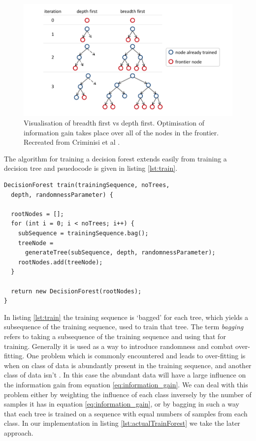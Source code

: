 \documentclass[12pt,twoside,notitlepage]{report}
\begin{document}
          \begin{figure}
              \centering
              \includegraphics[scale=0.3]{breadthfirst_vs_depthfirst}
              \caption[Visualisation of breadth first vs depth first.]{Visualisation of breadth first vs depth first. Optimisation of information gain takes place over 
              all of the nodes in the frontier. Recreated from Criminisi et al \cite{criminisi2013decision}.}
              \label{fig:breadth_first}
          \end{figure}

          The algorithm for training a decision forest extends easily from training a decision tree and psuedocode is 
          given in listing \ref{lst:train}.

          \begin{lstlisting}[float=tp,caption={Psuedocode to train a decision forest.},label={lst:train}]
DecisionForest train(trainingSequence, noTrees, 
  depth, randomnessParameter) {

  rootNodes = [];
  for (int i = 0; i < noTrees; i++) {
    subSequence = trainingSequence.bag();
    treeNode = 
      generateTree(subSequence, depth, randomnessParameter);
    rootNodes.add(treeNode);
  }

  return new DecisionForest(rootNodes);
}
          \end{lstlisting}

          In listing \ref{lst:train} the training sequence is `bagged' for each tree, which yields a subsequence of the 
          training sequence, used to train that tree. The term \textit{bagging} refers to taking a subsequence 
          of the training sequence and using that for training. Generally it is used as a way to introduce randomness and 
          combat over-fitting. One problem which is commonly encountered and leads to over-fitting is when 
          on class of data is abundantly present in the training sequence, and another class of data isn't \cite{criminisi2013decision}. 
          In this case the abundant data will have a large influence 
          on the information gain from equation \ref{eq:information_gain}. We 
          can deal with this problem either by weighting the influence of each class inversely by the number of samples it has in equation 
          \ref{eq:information_gain}, or by bagging in such a way that each tree is trained on a sequence with equal 
          numbers of samples from each class. In our implementation in listing \ref{lst:actualTrainForest} we take the 
          later approach. 
\end{document}
